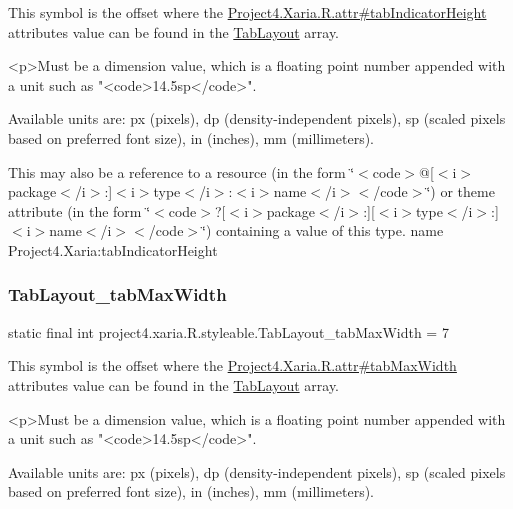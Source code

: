 This symbol is the offset where the \hyperlink{}{Project4.\+Xaria.\+R.\+attr\#tab\+Indicator\+Height} attribute\textquotesingle{}s value can be found in the \hyperlink{classproject4_1_1xaria_1_1R_1_1styleable_ab6bfb1f97ae9fba16f4f90d50871d4a8}{Tab\+Layout} array.

\begin{DoxyVerb}      <p>Must be a dimension value, which is a floating point number appended with a unit such as "<code>14.5sp</code>".
\end{DoxyVerb}
 Available units are\+: px (pixels), dp (density-\/independent pixels), sp (scaled pixels based on preferred font size), in (inches), mm (millimeters). 

This may also be a reference to a resource (in the form \char`\"{}$<$code$>$@\mbox{[}$<$i$>$package$<$/i$>$\+:\mbox{]}$<$i$>$type$<$/i$>$\+:$<$i$>$name$<$/i$>$$<$/code$>$\char`\"{}) or theme attribute (in the form \char`\"{}$<$code$>$?\mbox{[}$<$i$>$package$<$/i$>$\+:\mbox{]}\mbox{[}$<$i$>$type$<$/i$>$\+:\mbox{]}$<$i$>$name$<$/i$>$$<$/code$>$\char`\"{}) containing a value of this type.  name Project4.\+Xaria\+:tab\+Indicator\+Height \mbox{\label{classproject4_1_1xaria_1_1R_1_1styleable_a98754c74e515696696a25d422e921ca4}} 
\subsubsection{\texorpdfstring{Tab\+Layout\+\_\+tab\+Max\+Width}{TabLayout\_tabMaxWidth}}
{\footnotesize\ttfamily static final int project4.\+xaria.\+R.\+styleable.\+Tab\+Layout\+\_\+tab\+Max\+Width = 7\hspace{0.3cm}{\ttfamily [static]}}

This symbol is the offset where the \hyperlink{}{Project4.\+Xaria.\+R.\+attr\#tab\+Max\+Width} attribute\textquotesingle{}s value can be found in the \hyperlink{classproject4_1_1xaria_1_1R_1_1styleable_ab6bfb1f97ae9fba16f4f90d50871d4a8}{Tab\+Layout} array.

\begin{DoxyVerb}      <p>Must be a dimension value, which is a floating point number appended with a unit such as "<code>14.5sp</code>".
\end{DoxyVerb}
 Available units are\+: px (pixels), dp (density-\/independent pixels), sp (scaled pixels based on preferred font size), in (inches), mm (millimeters). 

